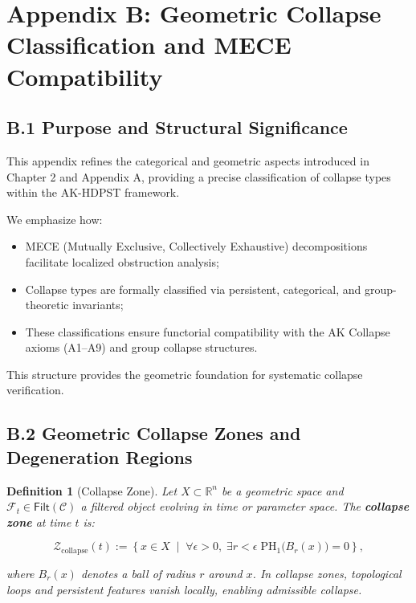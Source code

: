 \documentclass[11pt]{article}
\newtheorem{definition}[theorem]{Definition}
\begin{document}
\section*{Appendix B: Geometric Collapse Classification and MECE Compatibility}

\subsection*{B.1 Purpose and Structural Significance}

This appendix refines the categorical and geometric aspects introduced in Chapter 2 and Appendix A, providing a precise classification of collapse types within the AK-HDPST framework.

We emphasize how:

\begin{itemize}
    \item MECE (Mutually Exclusive, Collectively Exhaustive) decompositions facilitate localized obstruction analysis;
    \item Collapse types are formally classified via persistent, categorical, and group-theoretic invariants;
    \item These classifications ensure functorial compatibility with the AK Collapse axioms (A1–A9) and group collapse structures.
\end{itemize}

This structure provides the geometric foundation for systematic collapse verification.

\subsection*{B.2 Geometric Collapse Zones and Degeneration Regions}

\begin{definition}[Collapse Zone]
Let \( X \subset \mathbb{R}^n \) be a geometric space and \( \mathcal{F}_t \in \mathsf{Filt}(\mathcal{C}) \) a filtered object evolving in time or parameter space. The \textbf{collapse zone} at time \( t \) is:

\[
\mathcal{Z}_{\mathrm{collapse}}(t) := \left\{ x \in X \;\middle|\; \forall \epsilon > 0, \; \exists r < \epsilon \; \mathrm{PH}_1\big(B_r(x)\big) = 0 \right\},
\]

where \( B_r(x) \) denotes a ball of radius \( r \) around \( x \). In collapse zones, topological loops and persistent features vanish locally, enabling admissible collapse.

\end{definition}
\end{document}
